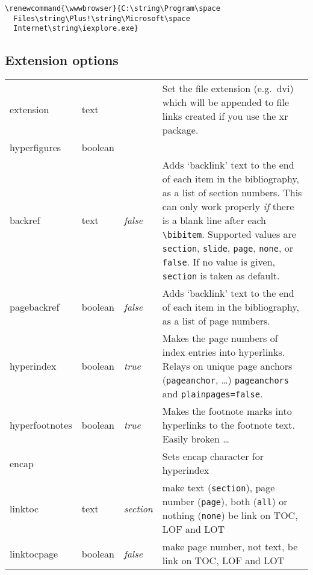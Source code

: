 \documentclass{article}
\newcommand*{\xpackage}[1]{\textsf{#1}}
\begin{document}
\begin{verbatim}
\renewcommand{\wwwbrowser}{C:\string\Program\space
  Files\string\Plus!\string\Microsoft\space
  Internet\string\iexplore.exe}
\end{verbatim}

\subsection{Extension options}
\begin{longtable}{@{}>{\ttfamily}ll>{\itshape}lp{8cm}@{}}
extension      & text    &         & Set the file extension (e.g.\ \textsf{dvi}) which will be appended to file links
                                     created if you use the \xpackage{xr} package. \\
hyperfigures   & boolean &         & \\
backref        & text    & false   & Adds `backlink' text to the end of each item in the bibliography, as a list of
                                     section numbers. This can only work properly \emph{if} there is a blank line after
                                     each \verb|\bibitem|. Supported values are \verb|section|, \verb|slide|, \verb|page|,
                                     \verb|none|, or \verb|false|. If no value is given, \verb|section| is taken as default.\\
pagebackref    & boolean & false   & Adds `backlink' text to the end of each item in the bibliography, as a list of page
                                     numbers. \\
hyperindex     & boolean & true    & Makes the page numbers of index entries into hyperlinks. Relays on unique
                                     page anchors (\verb|pageanchor|, \ldots)
                                     \verb|pageanchors| and \verb|plainpages=false|. \\
hyperfootnotes & boolean & true    & Makes the footnote marks into hyperlinks to the footnote text.
                                     Easily broken \ldots\\
encap          &         &         & Sets encap character for hyperindex \\
linktoc        & text    & section & make text (\verb|section|), page number (\verb|page|), both (\verb|all|) or nothing (\verb|none|) be link on TOC, LOF and LOT \\
linktocpage    & boolean & false   & make page number, not text, be link on TOC, LOF and LOT \\

\end{longtable}
\end{document}
